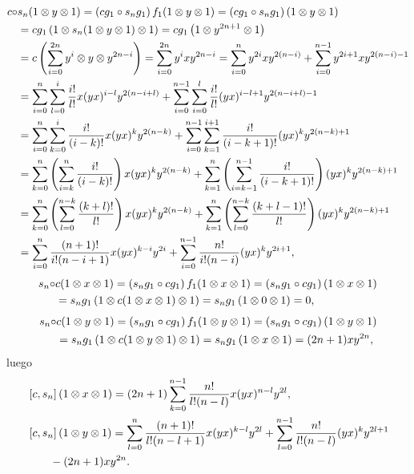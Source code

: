 \documentclass[fleqn,../tesis.tex]{subfiles}
\begin{document}
\begin{align*}
	c \circ & s_n(1 \otimes y \otimes 1) =  \left( cg_1 \circ s_n g_1\right)f_1(1 \otimes y \otimes 1)
		= \left( cg_1 \circ s_n g_ 1\right)(1 \otimes y \otimes 1)\\
	&= cg_1\left(1 \otimes s_n(1\otimes y\otimes 1) \otimes 1\right) = cg_1\left(1 \otimes y^{2n + 1} \otimes 1\right)\\
	&= c\left(\sum_{i = 0}^{2n}y^{i}\otimes y \otimes y^{2n - i}\right)
		= \sum_{i = 0}^{2n}y^{i} x y^{2n - i}
		= \sum_{i = 0}^{n}y^{2i}xy^{2(n - i)} + \sum_{i = 0}^{n - 1}y^{2i + 1}xy^{2(n - i) - 1}\\
	&= \sum_{i = 0}^{n}\sum_{l = 0}^{i}\frac{i!}{l!}x(yx)^{i - l}y^{2(n - i + l)}
		+ \sum_{i = 0}^{n - 1}\sum_{i =0}^{l}\frac{i!}{l!}(yx)^{i - l + 1}y^{2(n - i + l) -1}\\
	&= \sum_{i = 0}^{n}\sum_{k = 0}^{i}\frac{i!}{(i - k)!}x(yx)^{k}y^{2(n - k)}
		+ \sum_{i = 0}^{n - 1}\sum_{k = 1}^{i + 1}\frac{i!}{(i - k + 1)!}(yx)^{k}y^{2(n - k) +1}\\
	&= \sum_{k = 0}^{n}\left(\sum_{i = k}^{n}\frac{i!}{(i - k)!}\right)x(yx)^{k}y^{2(n - k)}
		+ \sum_{k = 1}^{n}
			\left(\sum_{i = k - 1}^{n - 1}\frac{i!}{(i - k + 1)!}\right)(yx)^{k}y^{2(n - k) +1}\\
	&= \sum_{k = 0}^{n}\left(\sum_{l = 0}^{n - k}\frac{(k + l)!}{l!}\right)x(yx)^{k}y^{2(n - k)}
		+ \sum_{k = 1}^{n}
			\left(\sum_{l = 0}^{n - k}\frac{(k + l - 1)!}{l!}\right)(yx)^{k}y^{2(n - k) +1}\\
	&= \sum_{i = 0}^{n}\frac{(n + 1)!}{i!(n -i + 1)} x(yx)^{k - i}y^{2i}
		+ \sum_{i = 0}^{n - 1}\frac{n!}{i!(n -i)} (yx)^{k}y^{2i +1},
\end{align*}
\begin{align*}
	s_n \circ & c(1 \otimes x \otimes 1) =  \left( s_ng_1 \circ c g_1\right)f_1(1 \otimes x \otimes 1)
		= \left( s_ng_1 \circ c g_ 1\right)(1 \otimes x \otimes 1)\\
	&= s_ng_1\left(1 \otimes c(1\otimes x \otimes 1) \otimes 1\right) = s_ng_1\left(1 \otimes 0 \otimes 1\right) = 0,
\end{align*}
\begin{align*}
	s_n \circ & c(1 \otimes y \otimes 1) =  \left( s_ng_1 \circ c g_1\right)f_1(1 \otimes y \otimes 1)
		= \left( s_ng_1 \circ c g_ 1\right)(1 \otimes y \otimes 1)\\
	&= s_ng_1\left(1 \otimes c(1\otimes y \otimes 1) \otimes 1\right) = s_ng_1\left(1 \otimes x \otimes 1\right) = (2n + 1)xy^{2n},
\end{align*}
luego
\begin{align*}
	&\left[c, s_n\right](1\otimes x \otimes 1)
		= (2n + 1)\sum_{k = 0}^{n -1}\frac{n!}{l!(n - l)} x(yx)^{n - l}y^{2l},\\
	&\left[c, s_n\right](1\otimes y \otimes 1)
		= \sum_{l = 0}^{n}\frac{(n + 1)!}{l!(n -l + 1)} x(yx)^{k - l}y^{2l}
		+ \sum_{l = 0}^{n - 1}\frac{n!}{l!(n -l)} (yx)^{k}y^{2l +1}\\
	&\qquad- (2n +  1)xy^{2n}.
\end{align*}
\end{document}
